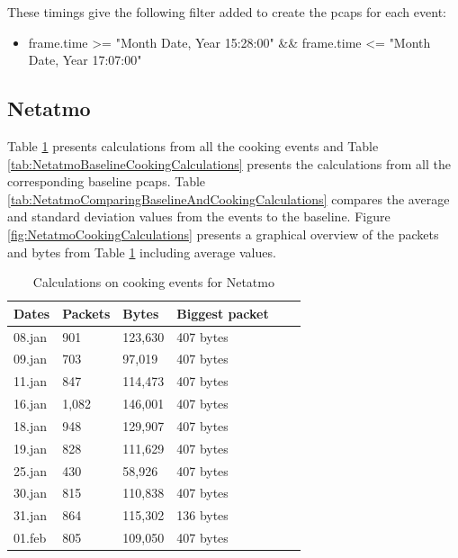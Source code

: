 These timings give the following filter added to create the pcaps for each event:

\begin{itemize}
    \item frame.time >= "Month Date, Year 15:28:00" \&\& frame.time <= "Month Date, Year 17:07:00"
\end{itemize}

\newpage
\subsection{Netatmo}
Table \ref{tab:NetatmoCookingCalculations} presents calculations from all the cooking events and Table \ref{tab:NetatmoBaselineCookingCalculations} presents the calculations from all the corresponding baseline pcaps. Table \ref{tab:NetatmoComparingBaselineAndCookingCalculations} compares the average and standard deviation values from the events to the baseline. Figure \ref{fig:NetatmoCookingCalculations} presents a graphical overview of the packets and bytes from Table \ref{tab:NetatmoCookingCalculations} including average values.

\begin{table}[H]
    \centering
    \caption{Calculations on cooking events for Netatmo}
    \begin{tabular}{|l|l|l|l|l|l|}
    \hline
        \textbf{Dates} & \textbf{Packets} & \textbf{Bytes} & \textbf{Biggest packet} \\ \hline
        08.jan & 901 & 123,630 & 407 bytes\\ \hline
        09.jan & 703 & 97,019 & 407 bytes \\ \hline
        11.jan & 847 & 114,473 & 407 bytes\\ \hline
        16.jan & 1,082 & 146,001 & 407 bytes\\ \hline
        18.jan & 948 & 129,907 & 407 bytes\\ \hline
        19.jan & 828 & 111,629 & 407 bytes \\ \hline
        25.jan & 430 & 58,926 & 407 bytes \\ \hline
        30.jan & 815 & 110,838 & 407 bytes \\ \hline
        31.jan & 864 & 115,302 & 136 bytes \\ \hline
        01.feb & 805 & 109,050 & 407 bytes \\ \hline
    \end{tabular}
    \label{tab:NetatmoCookingCalculations}
\end{table}

